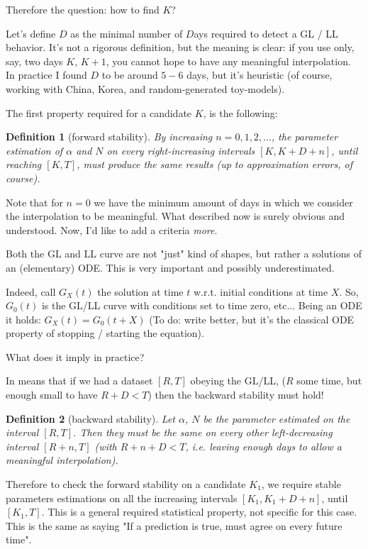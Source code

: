 \documentclass[6pt]{article}
\newtheorem{deff}{Definition}
\begin{document}
Therefore the question: how to find $K$?

Let's define $D$ as the minimal number of $D$ays required to detect a GL / LL behavior. It's not a rigorous definition, but the meaning is clear:
if you use only, say, two days $K$, $K+1$, you cannot hope to have any meaningful interpolation. In practice I found $D$ to be around $5-6$ days,
but it's heuristic (of course, working with China, Korea, and random-generated toy-models).

The first property required for a candidate $K$, is the following:

\begin{deff}[forward stability]
By increasing $n = 0, 1, 2, \dots$, the parameter estimation of $\alpha$ and $N$ on every right-increasing intervals $[K, K + D + n]$, 
until reaching $[K, T]$, must produce the same results (up to approximation errors, of course).
\end{deff}

Note that for $n = 0$ we have the minimum amount of days in which we consider the interpolation to be meaningful.
What described now is surely obvious and understood. Now, I'd like to add a criteria \emph{more}.


Both the GL and LL curve are not "just" kind of shapes, but rather a solutions of an (elementary) ODE. This is very important and possibly underestimated.

Indeed, call $G_X(t)$ the solution at time $t$ w.r.t. initial conditions at time $X$. So, $G_0(t)$ is the GL/LL curve with conditions set to time zero, etc...
Being an ODE it holds: $G_X(t) = G_0(t + X)$ (To do: write better, but it's the classical ODE property of stopping / starting the equation).


What does it imply in practice? 

In means that if we had a dataset $[R, T]$ obeying the GL/LL, ($R$ some time, but enough small to have $R + D < T$) then the backward stability must hold!

\begin{deff}[backward stability]
Let $\alpha$, $N$ be the parameter estimated on the interval $[R, T]$. Then they must be the same on every other left-decreasing interval
$[R + n, T]$ (with $R + n + D < T$, i.e. leaving enough days to allow a meaningful interpolation).
\end{deff}

Therefore to check the forward stability on a candidate $K_1$, we require stable parameters estimations on all 
the increasing intervals $[K_1, K_1 + D + n]$, until $[K_1, T]$. This is a general required statistical property, not specific for this case.
This is the same as saying "If a prediction is true, must agree on every future time".
\end{document}
